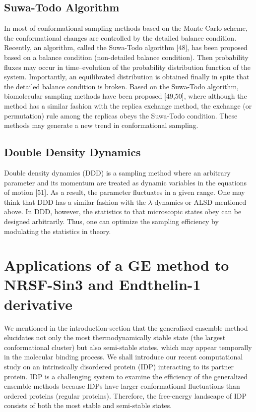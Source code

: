 \section{Suwa-Todo Algorithm}
In most of conformational sampling methods based on the Monte-Carlo scheme, the conformational changes are controlled by the detailed balance condition. Recently, an algorithm, called the Suwa-Todo algorithm [48], has been proposed based on a balance condition (non-detailed balance condition). Then probability fluxes may occur in time–evolution of the probability distribution function of the system. Importantly, an equilibrated distribution is obtained finally in spite that the detailed balance condition is broken. Based on the Suwa-Todo algorithm, biomolecular sampling methods have been proposed [49,50], where although the method has a similar fashion with the replica exchange method, the exchange (or permutation) rule among the replicas obeys the Suwa-Todo condition. These methods may generate a new trend in conformational sampling.

\section{Double Density Dynamics}
Double density dynamics (DDD) is a sampling method where an arbitrary parameter and its momentum are treated as dynamic variables in the equations of motion [51]. As a result, the parameter fluctuates in a given range. One may think that DDD has a similar fashion with the $\lambda$-dynamics or ALSD mentioned above. In DDD, however, the statistics to that microscopic states obey can be designed arbitrarily. Thus, one can optimize the sampling efficiency by modulating the statistics in theory.

\chapter{Applications of a GE method to NRSF-Sin3 and Endthelin-1 derivative}
We mentioned in the introduction-section that the generalised ensemble method elucidates not only the most thermodynamically stable state (the largest conformational cluster) but also semi-stable states, which may appear temporally in the molecular binding process. We shall introduce our recent computational study on an intrinsically disordered protein (IDP) interacting to its partner protein. IDP is a challenging system to examine the efficiency of the generalized ensemble methods because IDPs have larger conformational fluctuations than ordered proteins (regular proteins). Therefore, the free-energy landscape of IDP consists of both the most stable and semi-stable states. 

